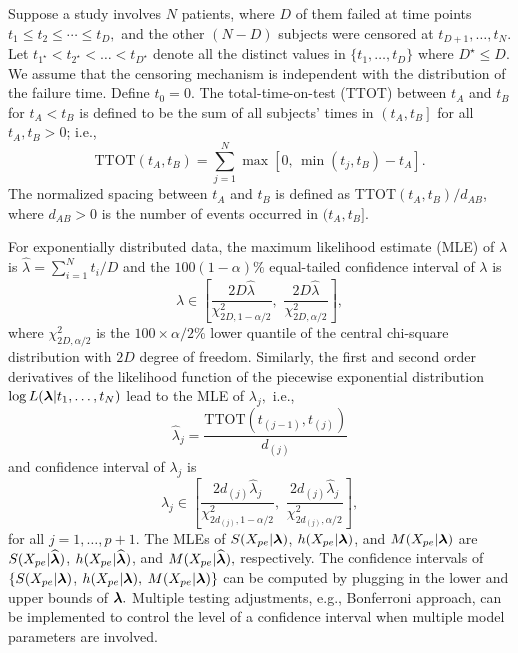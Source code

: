 \documentclass[12pt] {article}
\newcommand{\bt}[1]{\mbox{\boldmath $#1$}}
\begin{document}
Suppose a study involves $N$ patients, where $D$ of
them failed at time points
$t_1 \leq t_2 \leq \cdots \leq t_D,$ and the other
$(N-D)$ subjects were censored at $t_{D+1},\ldots, t_N$.
Let $t_{1^\star} < t_{2^\star} < \ldots < t_{D^\star}$
denote all the distinct values in $\{t_1,\ldots,t_D\}$
where $D^\star \leq D$. We assume that the censoring
mechanism is independent with the distribution of the
failure time. Define $t_0=0$. The total-time-on-test (TTOT)
between $t_A$ and $t_B$ for $t_A < t_B$ is defined to
be the sum of all subjects' times in $\left(t_A,t_B\right]$
for all $t_A,t_B > 0$; i.e.,
$$\textrm{TTOT}\left(t_A,t_B \right) = \sum^N_{j=1} \max \left[ 0,\,
\min (t_j, t_B) - t_A \right].$$
The normalized spacing between $t_A$ and $t_B$ is defined
as TTOT$\left( t_A,t_B \right)/d_{AB}$, where $d_{AB} > 0$
is the number of events occurred in $(t_A,t_B].$

For exponentially distributed data,
the maximum likelihood estimate (MLE) of $\lambda$ is
$\widehat{\lambda}=\sum^N_{i=1}t_i/D$
and the $100 (1-\alpha) \%$
equal-tailed confidence interval of $\lambda$ is
$$\lambda \in \left[ \frac{2D \widehat{\lambda}}
{\chi_{2D,1-\alpha/2}^2}, \,\,
\frac{2 D \widehat{\lambda}}{\chi_{2D,\alpha/2}^2} \right],$$
where $\chi^2_{2D,\alpha/2}$ is the $100\times \alpha/2 \%$
lower quantile of the central chi-square distribution
with $2D$ degree of freedom.
Similarly, the first and second order derivatives of
the likelihood function of the piecewise exponential
distribution $\log L(\bt{\lambda}|t_1,\ldots,t_N)$
lead to the MLE of $\lambda_j,$ i.e.,
$$\widehat{\lambda}_j = \frac{\textrm{TTOT}(t_{(j-1)},
t_{(j)})}{d_{(j)}}$$ and confidence interval of $\lambda_j$ is
$$\lambda_j \in \left[ \frac{2d_{(j)} \widehat{\lambda}_{j}}
{\chi_{2 d_{(j)},1-\alpha/2}^2}, \,\,
\frac{2 d_{(j)} \widehat{\lambda}_{j}}
{\chi_{2d_{(j)},\alpha/2}^2} \right],$$
for all $j = 1,\ldots,p+1.$ The MLEs of $S(X_{pe}|\bt{\lambda})$, $h(X_{pe}|\bt{\lambda})$,
and $M(X_{pe}|\bt{\lambda})$ are $S(X_{pe}|\widehat{\bt{\lambda}})$,
$h(X_{pe}|\widehat{\bt{\lambda}})$, and $M(X_{pe}|\widehat{\bt{\lambda}}),$
respectively.
The confidence intervals of
$\{S(X_{pe}|\bt{\lambda})$, $h(X_{pe}|\bt{\lambda}),$ $M(X_{pe}|\bt{\lambda})\}$
can be computed by plugging in the lower and upper bounds of $\bt{\lambda}.$
Multiple testing adjustments, e.g., Bonferroni approach, can be
implemented to control the level of a confidence interval
when multiple model parameters are involved.
\end{document}
